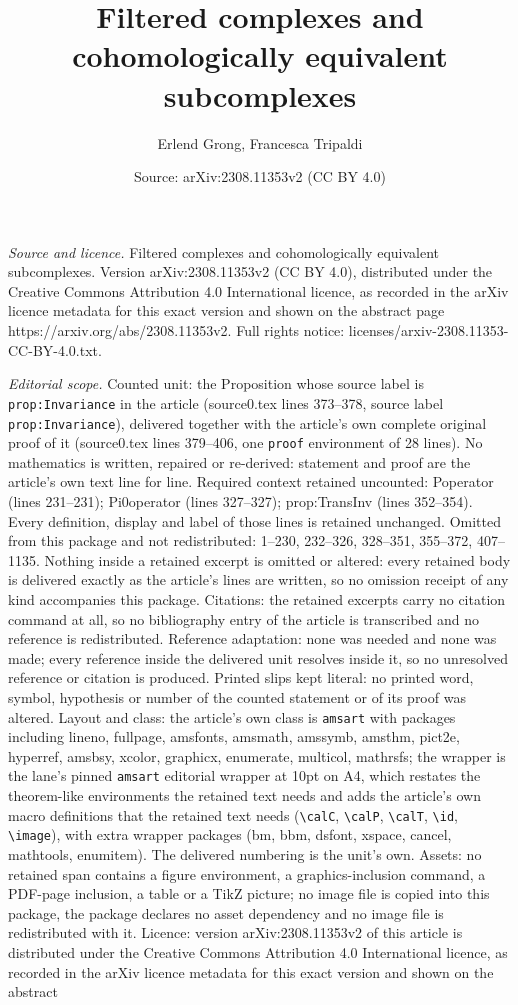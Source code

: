 \documentclass[10pt,a4paper]{amsart}
\title[Filtered complexes and cohomologically equivalent subcomplex]{Filtered complexes and cohomologically equivalent subcomplexes}
\author{Erlend Grong, Francesca Tripaldi}
\date{Source: arXiv:2308.11353v2 (CC BY 4.0)}
\begin{document}
\maketitle

\noindent\emph{Source and licence.} Filtered complexes and cohomologically equivalent subcomplexes. Version arXiv:2308.11353v2 (CC BY 4.0), distributed under the Creative Commons Attribution 4.0 International licence, as recorded in the arXiv licence metadata for this exact version and shown on the abstract page https://arxiv.org/abs/2308.11353v2. Full rights notice: licenses/arxiv-2308.11353-CC-BY-4.0.txt.\par\smallskip

\noindent\textit{Editorial scope.} Counted unit: the Proposition whose source label is \texttt{prop:Invariance} in the article (source0.tex lines 373--378, source label \texttt{prop:Invariance}), delivered together with the article's own complete original proof of it (source0.tex lines 379--406, one \texttt{proof} environment of 28 lines). No mathematics is written, repaired or re-derived: statement and proof are the article's own text line for line. Required context retained uncounted: Poperator (lines 231--231); Pi0operator (lines 327--327); prop:TransInv (lines 352--354). Every definition, display and label of those lines is retained unchanged. Omitted from this package and not redistributed: 1--230, 232--326, 328--351, 355--372, 407--1135. Nothing inside a retained excerpt is omitted or altered: every retained body is delivered exactly as the article's lines are written, so no omission receipt of any kind accompanies this package. Citations: the retained excerpts carry no citation command at all, so no bibliography entry of the article is transcribed and no reference is redistributed. Reference adaptation: none was needed and none was made; every reference inside the delivered unit resolves inside it, so no unresolved reference or citation is produced. Printed slips kept literal: no printed word, symbol, hypothesis or number of the counted statement or of its proof was altered. Layout and class: the article's own class is \texttt{amsart} with packages including lineno, fullpage, amsfonts, amsmath, amssymb, amsthm, pict2e, hyperref, amsbsy, xcolor, graphicx, enumerate, multicol, mathrsfs; the wrapper is the lane's pinned \texttt{amsart} editorial wrapper at 10pt on A4, which restates the theorem-like environments the retained text needs and adds the article's own macro definitions that the retained text needs (\texttt{\textbackslash calC}, \texttt{\textbackslash calP}, \texttt{\textbackslash calT}, \texttt{\textbackslash id}, \texttt{\textbackslash image}), with extra wrapper packages (bm, bbm, dsfont, xspace, cancel, mathtools, enumitem). The delivered numbering is the unit's own. Assets: no retained span contains a figure environment, a graphics-inclusion command, a PDF-page inclusion, a table or a TikZ picture; no image file is copied into this package, the package declares no asset dependency and no image file is redistributed with it. Licence: version arXiv:2308.11353v2 of this article is distributed under the Creative Commons Attribution 4.0 International licence, as recorded in the arXiv licence metadata for this exact version and shown on the abstract 
\end{document}
